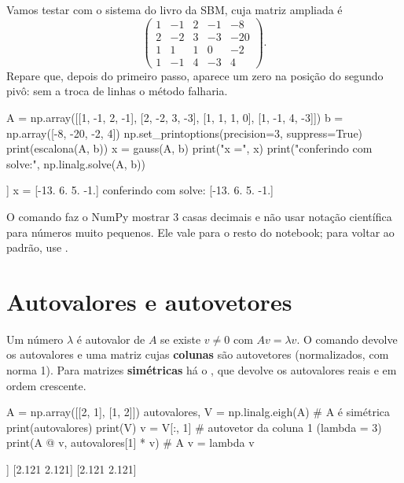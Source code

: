 Vamos testar com o sistema do livro da SBM, cuja matriz ampliada é
\[
\left(\begin{array}{rrrr|r}
1 & -1 & 2 & -1 & -8\\
2 & -2 & 3 & -3 & -20\\
1 & 1 & 1 & 0 & -2\\
1 & -1 & 4 & -3 & 4
\end{array}\right).
\]
Repare que, depois do primeiro passo, aparece um zero na posição do segundo pivô: sem a troca de linhas o método
falharia.

\begin{entrada}
A = np.array([[1, -1, 2, -1], [2, -2, 3, -3], [1, 1, 1, 0], [1, -1, 4, -3]])
b = np.array([-8, -20, -2, 4])
np.set_printoptions(precision=3, suppress=True)
print(escalona(A, b))
x = gauss(A, b)
print("x =", x)
print("conferindo com solve:", np.linalg.solve(A, b))
\end{entrada}
\begin{saida}
[[  2.   -2.    3.   -3.  -20. ]
 [  0.    2.   -0.5   1.5   8. ]
 [  0.    0.    2.5  -1.5  14. ]
 [  0.    0.    0.    0.8  -0.8]]
x = [-13.   6.   5.  -1.]
conferindo com solve: [-13.   6.   5.  -1.]
\end{saida}

\begin{observacao}
O comando  faz o NumPy mostrar 3 casas decimais e não usar
notação científica para números muito pequenos. Ele vale para o resto do notebook; para voltar ao padrão, use
.
\end{observacao}

\section{Autovalores e autovetores}

Um número $\lambda$ é autovalor de $A$ se existe $v\neq0$ com $Av=\lambda v$. O comando 
devolve os autovalores e uma matriz cujas \textbf{colunas} são autovetores (normalizados, com norma 1). Para
matrizes \textbf{simétricas} há o , que devolve os autovalores reais e em ordem crescente.

\begin{entrada}
A = np.array([[2, 1], [1, 2]])
autovalores, V = np.linalg.eigh(A)     # A é simétrica
print(autovalores)
print(V)
v = V[:, 1]                          # autovetor da coluna 1 (lambda = 3)
print(A @ v, autovalores[1] * v)     # A v = lambda v
\end{entrada}
\begin{saida}
[1. 3.]
[[-0.707  0.707]
 [ 0.707  0.707]]
[2.121 2.121] [2.121 2.121]
\end{saida}

